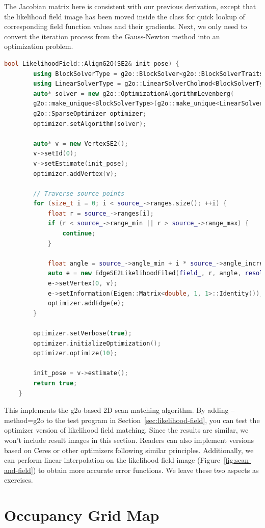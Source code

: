 The Jacobian matrix here is consistent with our previous derivation, except that the likelihood field image has been moved inside the class for quick lookup of corresponding field function values and their gradients. Next, we only need to convert the iteration process from the Gauss-Newton method into an optimization problem.

\begin{lstlisting}[language=c++,caption=src/ch6/likelihood\_field.cc]
	bool LikelihoodField::AlignG2O(SE2& init_pose) {
		using BlockSolverType = g2o::BlockSolver<g2o::BlockSolverTraits<3, 1>>;
		using LinearSolverType = g2o::LinearSolverCholmod<BlockSolverType::PoseMatrixType>;
		auto* solver = new g2o::OptimizationAlgorithmLevenberg(
		g2o::make_unique<BlockSolverType>(g2o::make_unique<LinearSolverType>()));
		g2o::SparseOptimizer optimizer;
		optimizer.setAlgorithm(solver);
		
		auto* v = new VertexSE2();
		v->setId(0);
		v->setEstimate(init_pose);
		optimizer.addVertex(v);
		
		// Traverse source points
		for (size_t i = 0; i < source_->ranges.size(); ++i) {
			float r = source_->ranges[i];
			if (r < source_->range_min || r > source_->range_max) {
				continue;
			}
			
			float angle = source_->angle_min + i * source_->angle_increment;
			auto e = new EdgeSE2LikelihoodFiled(field_, r, angle, resolution_);
			e->setVertex(0, v);
			e->setInformation(Eigen::Matrix<double, 1, 1>::Identity());
			optimizer.addEdge(e);
		}
		
		optimizer.setVerbose(true);
		optimizer.initializeOptimization();
		optimizer.optimize(10);
		
		init_pose = v->estimate();
		return true;
	}
\end{lstlisting}

This implements the g2o-based 2D scan matching algorithm. By adding --method=g2o to the test program in Section~\ref{sec:likelihood-field}, you can test the optimizer version of likelihood field matching. Since the results are similar, we won't include result images in this section. Readers can also implement versions based on Ceres or other optimizers following similar principles. Additionally, we can perform linear interpolation on the likelihood field image (Figure~\ref{fig:scan-and-field}) to obtain more accurate error functions. We leave these two aspects as exercises.

\section{Occupancy Grid Map}  
